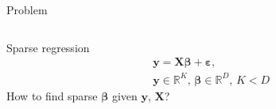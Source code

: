 \documentclass[9pt]{beamer}
\begin{document}
\begin{frame}{Problem}
  \begin{columns}
    \begin{column}{0.5\textwidth}
      \begin{block}{Sparse regression}
        \begin{align*}
          &\mathbf{y} = \mathbf{X}\boldsymbol\beta + \boldsymbol\varepsilon, \\
          &\mathbf{y}\in\mathbb{R}^K, \,\boldsymbol\beta\in\mathbb{R}^D, \, K< D
        \end{align*}
        How to find sparse $\boldsymbol\beta$ given $\mathbf{y}$, $\mathbf{X}$?
      \end{block}
%
    \end{column}


\end{columns}
\end{frame}
\end{document}
